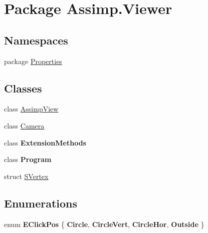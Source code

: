 \hypertarget{namespace_assimp_1_1_viewer}{\section{Package Assimp.\+Viewer}
\label{namespace_assimp_1_1_viewer}
}
\subsection*{Namespaces}
\begin{DoxyCompactItemize}
\item 
package \hyperlink{namespace_assimp_1_1_viewer_1_1_properties}{Properties}
\end{DoxyCompactItemize}
\subsection*{Classes}
\begin{DoxyCompactItemize}
\item 
class \hyperlink{class_assimp_1_1_viewer_1_1_assimp_view}{Assimp\+View}
\item 
class \hyperlink{class_assimp_1_1_viewer_1_1_camera}{Camera}
\item 
class {\bfseries Extension\+Methods}
\item 
class {\bfseries Program}
\item 
struct \hyperlink{struct_assimp_1_1_viewer_1_1_s_vertex}{S\+Vertex}
\end{DoxyCompactItemize}
\subsection*{Enumerations}
\begin{DoxyCompactItemize}
\item 
\hypertarget{namespace_assimp_1_1_viewer_a5a5475a6c2bf919c98bfd313c204d0a1}{enum {\bfseries E\+Click\+Pos} \{ {\bfseries Circle}, 
{\bfseries Circle\+Vert}, 
{\bfseries Circle\+Hor}, 
{\bfseries Outside}
 \}}\label{namespace_assimp_1_1_viewer_a5a5475a6c2bf919c98bfd313c204d0a1}

\end{DoxyCompactItemize}
